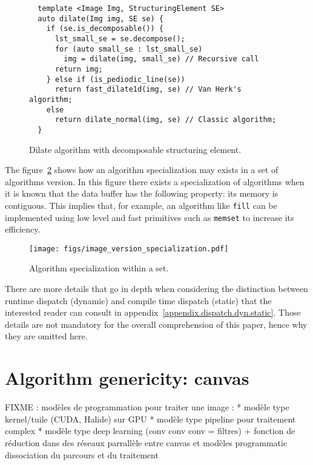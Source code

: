 \begin{figure}[tbh]
  \centering
  \begin{verbatim}
  template <Image Img, StructuringElement SE>
  auto dilate(Img img, SE se) {
    if (se.is_decomposable()) {
      lst_small_se = se.decompose();
      for (auto small_se : lst_small_se)
        img = dilate(img, small_se) // Recursive call
      return img;
    } else if (is_pediodic_line(se))
      return fast_dilate1d(img, se) // Van Herk's algorithm;
    else
      return dilate_normal(img, se) // Classic algorithm;
  }
  \end{verbatim}

  \caption{Dilate algorithm with decomposable structuring element.}
  \label{fig.decomp.dilate}
\end{figure}

The figure~\ref{fig.image.specialization} shows how an algorithm specialization may exists in a set of algorithms
version. In this figure there exists a specialization of algorithms when it is known that the data buffer has the
following property: its memory is contiguous. This implies that, for example, an algorithm like \texttt{fill} can be
implemented using low level and fast primitives such as \texttt{memset} to increase its efficiency.

\begin{figure}[tbh]
  \centering
  \texttt{[image: figs/image\_version\_specialization.pdf]}
  \caption{Algorithm specialization within a set.}
  \label{fig.image.specialization}
\end{figure}

There are more details that go in depth when considering the distinction between runtime dispatch (dynamic) and
compile time dispatch (static) that the interested reader can consult in appendix~\ref{appendix.dispatch.dyn.static}.
Those details are not mandatory for the overall comprehension of this paper, hence why they are omitted here.


\chapter{Algorithm genericity: canvas}
\label{sec.algo}

FIXME : modèles de programmation pour traiter une image :
* modèle type kernel/tuile (CUDA, Halide) sur GPU
* modèle type pipeline pour traitement complex
* modèle type deep learning (conv conv conv = filtres) + fonction de réduction dans des réseaux
parrallèle entre canvas et modèles programmatic
dissociation du parcours et du traitement

